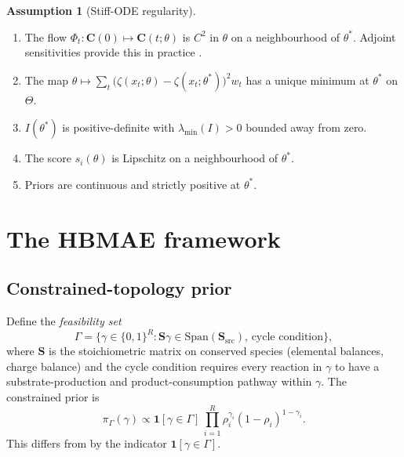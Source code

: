 \documentclass[11pt]{article}
\theoremstyle{definition}
\newtheorem{assumption}{Assumption}
\theoremstyle{remark}
\begin{document}
\begin{assumption}[Stiff-ODE regularity]\label{ass:regularity}\leavevmode
\begin{enumerate}[label=(R\arabic*),leftmargin=*]
  \item The flow $\Phi_t:\mathbf{C}(0)\mapsto \mathbf{C}(t;\theta)$ is $C^2$ in $\theta$ on a
        neighbourhood of $\theta^*$. Adjoint sensitivities provide this in practice
        \citep{SciML2024}.
  \item The map $\theta\mapsto \sum_t\bigl(\zeta(x_t;\theta)-\zeta(x_t;\theta^*)\bigr)^2 w_t$
        has a unique minimum at $\theta^*$ on $\Theta$.
  \item $I(\theta^*)$ is positive-definite with $\lambda_{\min}(I)>0$ bounded away from zero.
  \item The score $s_i(\theta)$ is Lipschitz on a neighbourhood of $\theta^*$.
  \item Priors are continuous and strictly positive at $\theta^*$.
\end{enumerate}
\end{assumption}

\section{The HBMAE framework}\label{sec:framework}

\subsection{Constrained-topology prior}

Define the \emph{feasibility set}
\begin{equation}\label{eq:Gamma}
  \Gamma = \bigl\{\gamma\in\{0,1\}^R : \mathbf{S}\gamma\in\mathrm{Span}(\mathbf{S}_{\mathrm{src}}),\,
              \text{cycle condition}\bigr\},
\end{equation}
where $\mathbf{S}$ is the stoichiometric matrix on conserved species (elemental balances,
charge balance) and the cycle condition requires every reaction in $\gamma$ to have a
substrate-production and product-consumption pathway within $\gamma$. The constrained
prior is
\begin{equation}\label{eq:constrained_prior}
  \pi_\Gamma(\gamma) \propto \mathbf{1}[\gamma\in\Gamma]\,\prod_{i=1}^R
  \rho_i^{\gamma_i}(1-\rho_i)^{1-\gamma_i}.
\end{equation}
This differs from \citet{GalagaliMarzouk2015} by the indicator $\mathbf{1}[\gamma\in\Gamma]$.
\end{document}
